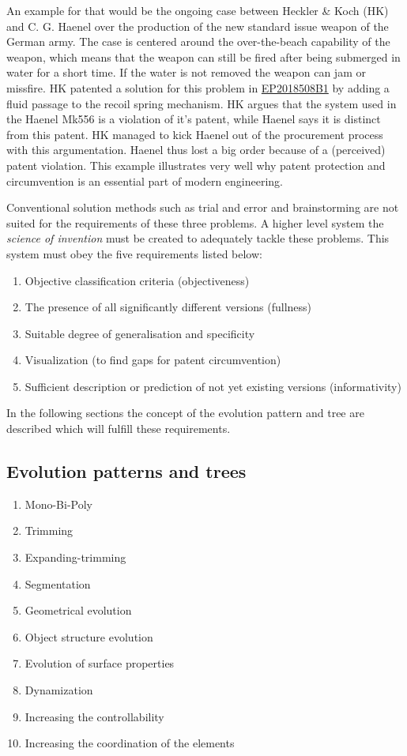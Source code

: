 \documentclass[11pt,a4paper]{article}
\begin{document}
An example for that would be the ongoing case between Heckler \& Koch (HK) and
C. G. Haenel over the production of the new standard issue weapon of the
German army. The case is centered around the over-the-beach capability of the
weapon, which means that the weapon can still be fired after being submerged
in water for a short time. If the water is not removed the weapon can jam or
missfire. HK patented a solution for this problem in
\href{https://patents.google.com/patent/EP2018508B1/en}{EP2018508B1} by adding
a fluid passage to the recoil spring mechanism. HK argues that the system used
in the Haenel Mk556 is a violation of it's patent, while Haenel says it is
distinct from this patent. HK managed to kick Haenel out of the procurement
process with this argumentation. Haenel thus lost a big order because of a
(perceived) patent violation. This example illustrates very well why patent
protection and circumvention is an essential part of modern engineering.

Conventional solution methods such as trial and error and brainstorming are
not suited for the requirements of these three problems. A higher level system
the \textit{science of invention} must be created to adequately tackle these
problems. This system must obey the five requirements listed below:

\begin{enumerate}[noitemsep]
\item Objective classification criteria (objectiveness)
\item The presence of all significantly different versions (fullness)
\item Suitable degree of generalisation and specificity
\item Visualization (to find gaps for patent circumvention)
\item Sufficient description or prediction of not yet existing versions
  (informativity)
\end{enumerate}

In the following sections the concept of the evolution pattern and tree are
described which will fulfill these requirements.

\subsection{Evolution patterns and trees}

\begin{enumerate}[noitemsep]
\item Mono-Bi-Poly
\item Trimming
\item Expanding-trimming
\item Segmentation
\item Geometrical evolution
\item Object structure evolution
\item Evolution of surface properties
\item Dynamization
\item Increasing the controllability
\item Increasing the coordination of the elements
\end{enumerate}
\end{document}
